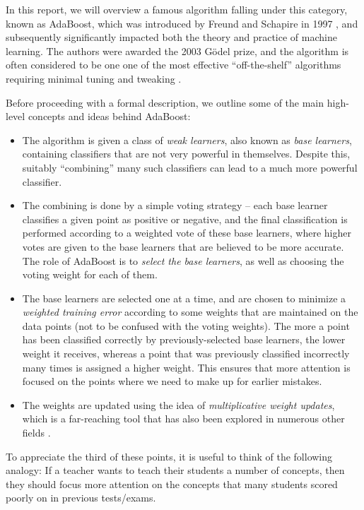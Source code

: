 \documentclass[english]{article}
\begin{document}
In this report, we will overview a famous algorithm falling under this category, known as AdaBoost, which was introduced by Freund and Schapire in 1997 \cite{freund1997decision}, and subsequently significantly impacted both the theory and practice of machine learning.  The authors were awarded the 2003 G\"odel prize, and the algorithm is often considered to be one one of the most effective ``off-the-shelf'' algorithms requiring minimal tuning and tweaking \cite{blog,wiki}.

Before proceeding with a formal description, we outline some of the main high-level concepts and ideas behind AdaBoost:
\begin{itemize}
    \item The algorithm is given a class of {\em weak learners}, also known as {\em base learners}, containing classifiers that are not very powerful in themselves.  Despite this, suitably ``combining'' many such classifiers can lead to a much more powerful classifier.
    \item The combining is done by a simple voting strategy -- each base learner classifies a given point as positive or negative, and the final classification is performed according to a weighted vote of these base learners, where higher votes are given to the base learners that are believed to be more accurate. The role of AdaBoost is to {\em select the base learners}, as well as choosing the voting weight for each of them.
    \item The base learners are selected one at a time, and are chosen to minimize a {\em weighted training error} according to some weights that are maintained on the data points (not to be confused with the voting weights).  The more a point has been classified correctly by previously-selected base learners, the lower weight it receives, whereas a point that was previously classified incorrectly many times is assigned a higher weight.  This ensures that more attention is focused on the points where we need to make up for earlier mistakes.
    \item The weights are updated using the idea of {\em multiplicative weight updates}, which is a far-reaching tool that has also been explored in numerous other fields \cite{mult_weights}.
\end{itemize}
To appreciate the third of these points, it is useful to think of the following analogy: If a teacher wants to teach their students a number of concepts, then they should focus more attention on the concepts that many students scored poorly on in previous tests/exams.
\end{document}
